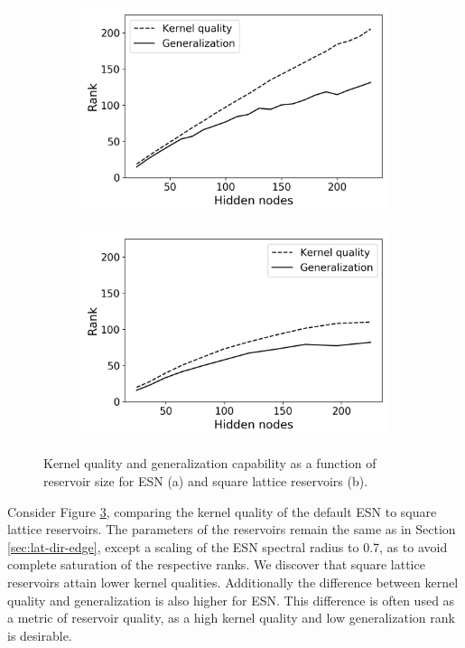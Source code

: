 \begin{figure}[t]
  \centering
  \begin{subfigure}{.49\textwidth}
    \centering
    \includegraphics[width=1.0\linewidth]{figures/esn-rank.png}
    \caption{}
    \label{fig:rank-a}
  \end{subfigure}
  \begin{subfigure}{.49\textwidth}
    \centering
    \includegraphics[width=1.0\linewidth]{figures/sq-rank.png}
    \caption{}
    \label{fig:rank-b}
  \end{subfigure}
  \caption{
    Kernel quality and generalization capability as a function of reservoir size
for ESN (a) and square lattice reservoirs (b).
  }
  \label{fig:rank}
\end{figure}

Consider Figure \ref{fig:rank}, comparing the kernel quality of the default ESN
to square lattice reservoirs. The parameters of the reservoirs remain the same
as in Section \ref{sec:lat-dir-edge}, except a scaling of the ESN spectral
radius to 0.7, as to avoid complete saturation of the respective ranks. We
discover that square lattice reservoirs attain lower kernel
qualities. Additionally the difference between kernel quality and generalization
is also higher for ESN. This difference is often used as a metric of reservoir
quality, as a high kernel quality and low generalization rank is desirable.

